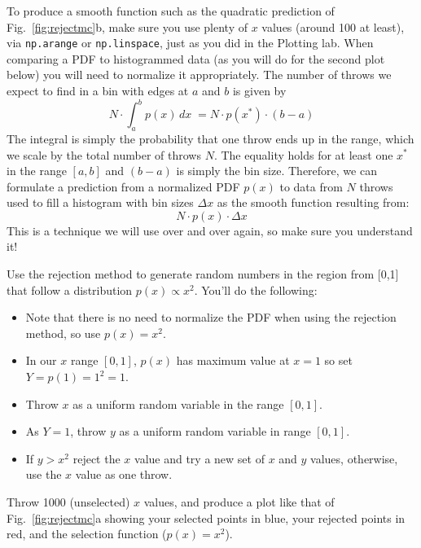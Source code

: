 To produce a smooth function such as the quadratic prediction of
Fig.~\ref{fig:rejectmc}b, make sure you use plenty of $x$ values
(around 100 at least), via {\tt np.arange} or {\tt np.linspace}, just
as you did in the Plotting lab.  When comparing a PDF to histogrammed
data (as you will do for the second plot below) you will need to
normalize it appropriately.  The number of throws we expect to find in
a bin with edges at $a$ and $b$ is given by
\begin{displaymath}
  N \cdot \int_a^b p(x) \, dx \; = N \cdot p(x^*) \cdot (b-a) 
\end{displaymath}
The integral is simply the probability that one throw ends up in the
range, which we scale by the total number of throws $N$.  The equality
holds for at least one $x^*$ in the range $[a,b]$ and $(b-a)$ is
simply the bin size.  Therefore, we can formulate a prediction from a
normalized PDF $p(x)$ to data from $N$ throws used to fill a histogram with
bin sizes $\Delta x$ as the smooth function resulting from:
\begin{displaymath}
N \cdot p(x) \cdot \Delta x
\end{displaymath}
This is a technique we will use over and over again, so make sure you
understand it!

\begin{plot} \end{plot}
Use the rejection method to generate random numbers in the region from [0,1] that follow a distribution $p(x) \propto x^2$.  You'll do the following:
\begin{itemize}
  \item Note that there is no need to normalize the PDF when using the rejection method, so use $p(x)=x^2$.
  \item In our $x$ range $[0,1]$, $p(x)$ has maximum value at $x=1$ so set $Y = p(1) = 1^2 = 1$. 
  \item Throw $x$ as a uniform random variable in the range $[0, 1]$.
  \item As $Y=1$, throw $y$ as a uniform random variable in range $[0, 1]$.
  \item If $y > x^2$ reject the $x$ value and try a new set of $x$ and $y$ values, otherwise, use the $x$ value as one throw.
\end{itemize}
Throw 1000 (unselected) $x$ values, and produce a plot like that of
Fig.~\ref{fig:rejectmc}a showing your selected points in blue, your
rejected points in red, and the selection function ($p(x) = x^2$).

